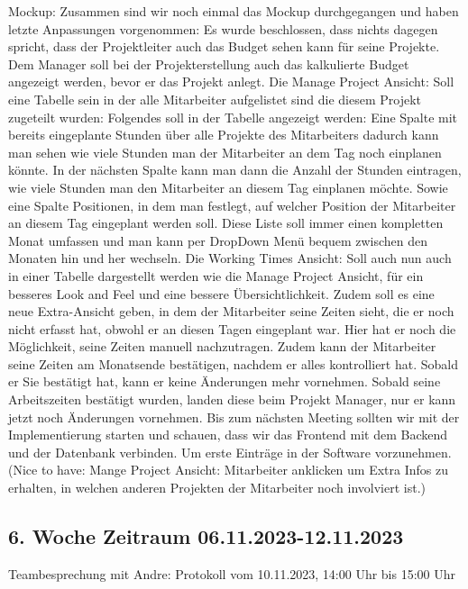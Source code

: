 \documentclass{article}
\begin{document}
    
    Mockup:
    Zusammen sind wir noch einmal das Mockup durchgegangen und haben letzte Anpassungen vorgenommen:
    Es wurde beschlossen, dass nichts dagegen spricht, dass der Projektleiter auch das Budget sehen kann für seine Projekte.
    Dem Manager soll bei der Projekterstellung auch das kalkulierte Budget angezeigt werden, bevor er das Projekt anlegt.
    Die Manage Project Ansicht: Soll eine Tabelle sein in der alle Mitarbeiter aufgelistet sind die diesem Projekt zugeteilt wurden: Folgendes soll in der Tabelle angezeigt werden: Eine Spalte mit bereits eingeplante Stunden über alle Projekte des Mitarbeiters dadurch kann man sehen wie viele Stunden man der Mitarbeiter an dem Tag noch einplanen könnte. In der nächsten Spalte kann man dann die Anzahl der Stunden eintragen, wie viele Stunden man den Mitarbeiter an diesem Tag einplanen möchte. Sowie eine Spalte Positionen, in dem man festlegt, auf welcher Position der Mitarbeiter an diesem Tag eingeplant werden soll.
    Diese Liste soll immer einen kompletten Monat umfassen und man kann per DropDown Menü bequem zwischen den Monaten hin und her wechseln.
    Die Working Times Ansicht: Soll auch nun auch in einer Tabelle dargestellt werden wie die Manage Project Ansicht, für ein besseres Look and Feel und eine bessere Übersichtlichkeit.
    Zudem soll es eine neue Extra-Ansicht geben, in dem der Mitarbeiter seine Zeiten sieht, die er noch nicht erfasst hat, obwohl er an diesen Tagen eingeplant war. Hier hat er noch die Möglichkeit, seine Zeiten manuell nachzutragen. Zudem kann der Mitarbeiter seine Zeiten am Monatsende bestätigen, nachdem er alles kontrolliert hat. Sobald er Sie bestätigt hat, kann er keine Änderungen mehr vornehmen. Sobald seine Arbeitszeiten bestätigt wurden, landen diese beim Projekt Manager, nur er kann jetzt noch Änderungen vornehmen.
    Bis zum nächsten Meeting sollten wir mit der Implementierung starten und schauen, dass wir das Frontend mit dem Backend und der Datenbank verbinden. Um erste Einträge in der Software vorzunehmen.
    (Nice to have: Mange Project Ansicht: Mitarbeiter anklicken um Extra Infos zu erhalten, in welchen anderen Projekten der Mitarbeiter noch involviert ist.)

    \subsection{6. Woche Zeitraum 06.11.2023-12.11.2023}
        Teambesprechung mit Andre: Protokoll vom 10.11.2023, 14:00 Uhr bis 15:00 Uhr
        
\end{document}

